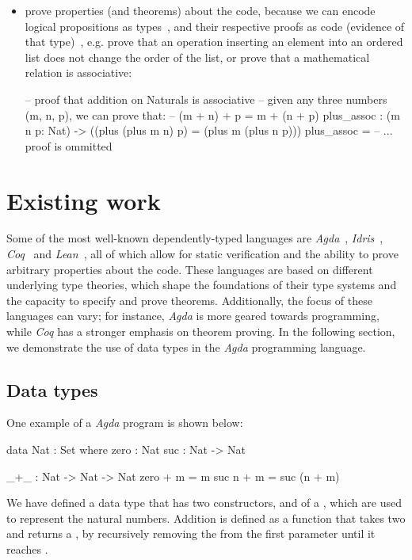 \begin{itemize}
       \item prove properties (and theorems) about the code, because we can encode logical propositions as types~\cite{nlab:propositions-as-types}, and their respective proofs as code (evidence of that type)~\cite{nlab:proofs-as-programs}, e.g. prove that an operation inserting an element into an ordered list does not change the order of the list, or prove that a mathematical relation is associative:
       \begin{piforall}
-- proof that addition on Naturals is associative
-- given any three numbers (m, n, p), we can prove that:
-- (m + n) + p = m + (n + p)
plus_assoc : (m n p: Nat) -> ((plus (plus m n) p) = (plus m (plus n p)))
plus_assoc = -- ... proof is ommitted
       \end{piforall}

\end{itemize}

\section{Existing work}

Some of the most well-known dependently-typed languages are \emph{Agda}~\cite{agda}, \emph{Idris}~\cite{idris}, \emph{Coq}~\cite{coq} and \emph{Lean}~\cite{lean}, all of which allow for static verification and the ability to prove arbitrary properties about the code. These languages are based on different underlying type theories, which shape the foundations of their type systems and the capacity to specify and prove theorems. Additionally, the focus of these languages can vary; for instance, \emph{Agda} is more geared towards programming, while \emph{Coq} has a stronger emphasis on theorem proving. In the following section, we demonstrate the use of data types in the \emph{Agda} programming language.

\subsection{Data types}
One example of a \emph{Agda} program is shown below:
\begin{piforall}
data Nat : Set where
       zero : Nat
       suc : Nat -> Nat

_+_ : Nat -> Nat -> Nat
zero + m = m
suc n + m = suc (n + m)
\end{piforall}

We have defined a data type  that has two constructors,  and  of a , which are used to represent the natural numbers.
Addition is defined as a function that takes two  and returns a , by recursively removing the  from the first parameter until it reaches .


